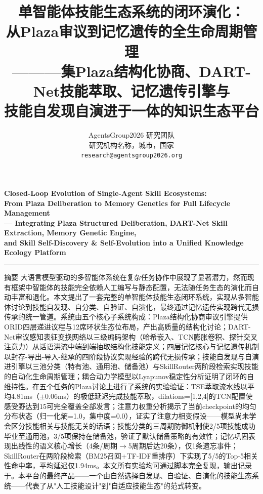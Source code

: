 \documentclass[12pt,a4paper]{ctexart}
\title{\zihao{2}\heiti 单智能体技能生态系统的闭环演化：\\从Plaza审议到记忆遗传的全生命周期管理\\
        \vspace{6pt}
        {\zihao{4}\heiti ———集Plaza结构化协商、DART-Net技能萃取、记忆遗传引擎与\\技能自发现自演进于一体的知识生态平台}}
\author{
  \zihao{4} AgentsGroup2026 研究团队 \\[4pt]
  \zihao{-5} 研究机构名称，城市，国家 \\[2pt]
  \zihao{-5} \texttt{research@agentsgroup2026.org}
}
\date{}
\begin{document}
\maketitle

\begin{center}
  {\bfseries Closed-Loop Evolution of Single-Agent Skill Ecosystems:\\[2pt]
  From Plaza Deliberation to Memory Genetics for Full Lifecycle Management\\[4pt]
  \kaishu --- Integrating Plaza Structured Deliberation, DART-Net Skill Extraction, Memory Genetic Engine,\\
  and Skill Self-Discovery \& Self-Evolution into a Unified Knowledge Ecology Platform}
\end{center}

\vspace{12pt}
\hrule
\vspace{12pt}

{\heiti{} 摘\quad 要\quad}
{\kaishu{}
大语言模型驱动的多智能体系统在复杂任务协作中展现了显著潜力，然而现有框架中智能体的技能完全依赖人工编写与静态配置，无法随任务生态的演化而自动丰富和退化。本文提出了一套完整的单智能体技能生态闭环系统，实现从多智能体讨论到技能自发现、自分类、自验证、自演化，最终通过记忆遗传实现跨代无损传承的统一管道。系统由五个核心子系统构成：Plaza结构化协商审议引擎提供ORID四层递进议程与12席环状生态位布局，产出高质量的结构化讨论；DART-Net审议感知表征变换网络以三级编码架构（哈希嵌入、TCN膨胀卷积、探针交叉注意力）从话语洪流中端到端抽取结构化技能定义；四层记忆核心与记忆遗传机制以封存-导出-导入-继承的四阶段协议实现经验的跨代无损传承；技能自发现与自演进引擎以三池分类（特有池、通用池、储备池）与SkillRouter两阶段检索实现技能的自动化生命周期管理；耦合动力学模型以Lyapunov稳定性分析证明了闭环的自维持性。在五个任务的Plaza讨论上进行了系统的实验验证：TSE萃取流水线以平均4.81ms（$\pm$0.06ms）的极低延迟完成技能萃取，dilations=[1,2,4]的TCN配置使感受野达到15可完全覆盖全部发言；注意力权重分析揭示了当前checkpoint的均匀分布状态（归一化熵=1.0，集中度=0.0），证实了注意力相变假设——模型尚未学会区分技能相关与技能无关的话语；技能分类的三周期防御机制使2/5项技能成功毕业至通用池，3/5项保持在储备池，验证了默认储备策略的有效性；记忆巩固表现出线性的语义核心增长（4条/周期$\to$5周期后达20条），仅1条遗忘事件；SkillRouter在两阶段检索（BM25召回+TF-IDF重排序）下实现了5/5的Top-5相关性命中率，平均延迟仅1.94ms。本文所有实验均可通过脚本完全复现，输出记录于。本平台的最终产品——一个由自然选择自发现、自验证、自演化的技能生态系统——代表了从"人工技能设计"到"自适应技能生态"的范式转变。
}
\end{document}
